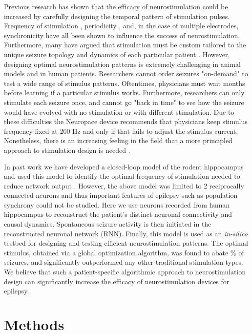 \documentclass[11pt,a4paper,final]{article}
\begin{document}
Previous research has shown that the efficacy of neurostimulation could be increased by carefully designing the temporal pattern of stimulation pulses.
Frequency of stimulation \citep{chkhenkeli97,cordeiro13}, periodicity \autocite{wyckhuys10,buffel14}, and, in the case of multiple electrodes, synchronicity \citep{nelson11,van14} have all been shown to influence the success of neurostimulation.
Furthermore, many have argued that stimulation must be custom tailored to the unique seizure topology and dynamics of each particular patient \citep{holt14,wendling13, taylor15}.
However, designing optimal neurostimulation patterns is extremely challenging in animal models and in human patients.
Researchers cannot order seizures "on-demand" to test a wide range of stimulus patterns.
Oftentimes, physicians must wait months before learning if a particular stimulus works.
Furthermore, researchers can only stimulate each seizure once, and cannot go "back in time" to see how the seizure would have evolved with no stimulation or with different stimulation.
Due to these difficulties the Neuropace device recommends that physicians keep stimulus frequency fixed at 200 Hz and only if that fails to adjust the stimulus current.
Nonetheless, there is an increasing feeling in the field that a more principled approach to stimulation design is needed \citep{netoff15}.

In past work we have developed a closed-loop model of the rodent hippocampus and used this model to identify the optimal frequency of stimulation needed to reduce network output \citep{sandler15clpp}.
However, the above model was limited to 2 reciprocally connected neurons and thus important features of epilepsy such as population synchrony could not be studied.
Here we use \nn{} neurons recorded from human hippocampus to reconstruct the patient's distinct neuronal connectivity and causal dynamics.
Spontaneous seizure activity is then initiated in the reconstructed neuronal network (RNN).
Finally, this model is used as an \textit{in-silico} testbed for designing and testing efficient neurostimulation patterns.
The optimal stimulus, obtained via a global optimization algorithm, was found to abate \success{}\% of seizures, and significantly outperformed any other traditional stimulation types.
We believe that such a patient-specific algorithmic approach to neurostimulation design can significantly increase the efficacy of neurostimulation devices for epilepsy.


\section{Methods \label{SM}}
\end{document}
